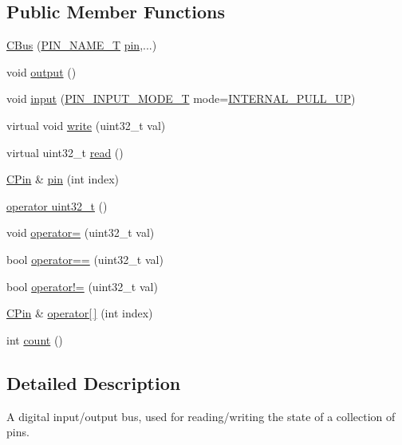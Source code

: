\subsection*{Public Member Functions}
\begin{DoxyCompactItemize}
\item 
\hyperlink{class_c_bus_a5f859ac1582a6cbe9b5b420c6c051e63}{C\-Bus} (\hyperlink{group___peripheral_ga65a2241721e4acb573e0c3fe29ac432f}{P\-I\-N\-\_\-\-N\-A\-M\-E\-\_\-\-T} \hyperlink{class_c_bus_a94da38619defc1c41c16c04c4c7991f8}{pin},...)
\item 
void \hyperlink{class_c_bus_a5f797dca77eb5a86048c65e567a2d233}{output} ()
\item 
void \hyperlink{class_c_bus_ad45a06493f12aef3d096ac3ed86a3b8f}{input} (\hyperlink{group___peripheral_gad5705547b72a4480dc714447b3bbfb64}{P\-I\-N\-\_\-\-I\-N\-P\-U\-T\-\_\-\-M\-O\-D\-E\-\_\-\-T} mode=\hyperlink{group___peripheral_gga16ce6180d8bb2eb23a7df8f8923ea581a781a7f23ae9b0dbdc6edfdcfd3be75df}{I\-N\-T\-E\-R\-N\-A\-L\-\_\-\-P\-U\-L\-L\-\_\-\-U\-P})
\item 
virtual void \hyperlink{class_c_bus_a4852669ff7ae53e68cf125aa49a87bd0}{write} (uint32\-\_\-t val)
\item 
virtual uint32\-\_\-t \hyperlink{class_c_bus_ae5c9d649c6f6b22a93fb29e0152a57c1}{read} ()
\item 
\hyperlink{class_c_pin}{C\-Pin} \& \hyperlink{class_c_bus_a94da38619defc1c41c16c04c4c7991f8}{pin} (int index)
\item 
\hyperlink{class_c_bus_add3835bd7327b63bdaa480938d5a8adc}{operator uint32\-\_\-t} ()
\item 
void \hyperlink{class_c_bus_a9f639b395906de4549c51deb0a0ad79c}{operator=} (uint32\-\_\-t val)
\item 
bool \hyperlink{class_c_bus_a55d1c493025b37e0f34801b8ced31068}{operator==} (uint32\-\_\-t val)
\item 
bool \hyperlink{class_c_bus_a3ea59ccbb16b92e2763a00b3baa10fd6}{operator!=} (uint32\-\_\-t val)
\item 
\hyperlink{class_c_pin}{C\-Pin} \& \hyperlink{class_c_bus_a12e4d076164971de589cbc5b2f6537e2}{operator\mbox{[}$\,$\mbox{]}} (int index)
\item 
int \hyperlink{class_c_bus_a4fa0e4c537c237278fe8092f4d8e26fb}{count} ()
\end{DoxyCompactItemize}


\subsection{Detailed Description}
A digital input/output bus, used for reading/writing the state of a collection of pins. 

